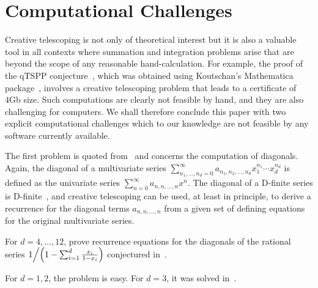 \documentclass{jssc}
\begin{document}
 \section{Computational Challenges}

 Creative telescoping is not only of theoretical interest but it is also a valuable tool in all contexts
 where summation and integration problems arise that are beyond the scope of any reasonable hand-calculation.
 For example, the proof of the qTSPP conjecture~\cite{koutschan10a}, which was obtained using Koutschan's Mathematica
 package~\cite{koutschan10c},
 involves a creative telescoping problem that leads to a certificate of 4Gb size. Such computations are clearly
 not feasible by hand, and they are also challenging for computers. We shall therefore conclude this paper
 with two explicit computational challenges which to our knowledge are not feasible by any software currently
 available.

 The first problem is quoted from~\cite{kauers11b} and concerns the computation of diagonals. Again, the diagonal
 of a multivariate series
 $\sum_{n_1,\dots,n_d=0}^\infty a_{n_1,n_2,\dots,n_d}x_1^{n_1}\cdots x_d^{n_d}$ is defined as the univariate series
 $\sum_{n=0}^\infty a_{n,n,\dots,n} x^n$. The diagonal of a D-finite series is D-finite~\cite{lipshitz88}, and creative
 telescoping can be used, at least in principle, to derive a recurrence for the diagonal terms $a_{n,n,\dots,n}$
 from a given set of defining equations for the original multivariate series.
 \begin{problem}
   For $d=4,\dots,12$, prove recurrence equations for the diagonals of the
   rational series $1\Big/\Bigl(1 - \sum_{i=1}^d\frac{x_i}{1-x_i}\Bigr)$
   conjectured in~\cite{kauers11b}.
 \end{problem}
 For $d=1,2$, the problem is easy. For $d=3$, it was solved in~\cite{bostan11}.
\end{document}
